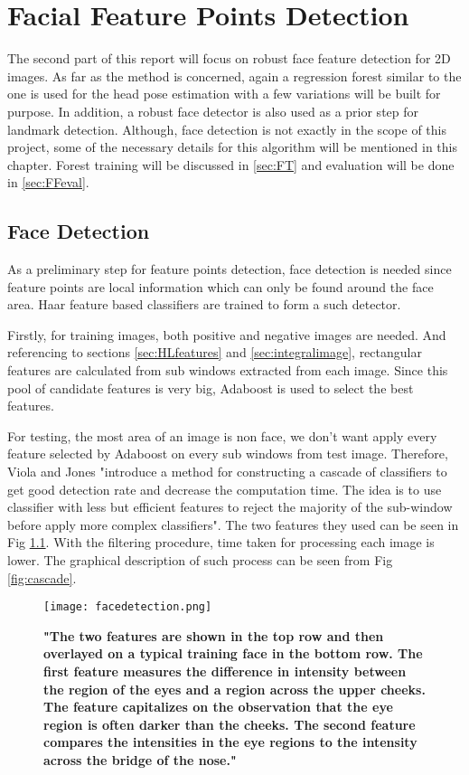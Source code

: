 \chapter{Facial Feature Points Detection}
\label{sec:FFPD}

The second part of this report will focus on robust face feature detection for 2D images. As far as the method is concerned, again a regression forest similar to the one is used for the head pose estimation with a few variations will be built for purpose. In addition, a robust face detector \cite{facedetect} is also used as a prior step for landmark detection. Although, face detection is not exactly in the scope of this project, some of the necessary details for this algorithm will be mentioned in this chapter. Forest training will be discussed in \ref{sec:FT} and evaluation will be done in \ref{sec:FFeval}.

\clearpage
\section{Face Detection}
\label{sec:FD}
As a preliminary step for feature points detection, face detection is needed since feature points are local information which can only be found around the face area. Haar feature based classifiers are trained to form a such detector.

Firstly, for training images, both positive and negative images are needed. And referencing to sections \ref{sec:HLfeatures} and \ref{sec:integralimage}, rectangular features are calculated from sub windows extracted from each image. Since this pool of candidate features is very big, Adaboost is used to select the best features. \cite{facedetect}

For testing, the most area of an image is non face, we don't want apply every feature selected by Adaboost on every sub windows from test image. Therefore, Viola and Jones "introduce a method for constructing a cascade of classifiers to get good detection rate and decrease the computation time. The idea is to use classifier with less but efficient features to reject the majority of the sub-window before apply more complex classifiers". \cite{facedetect} The two features they used can be seen in Fig \ref{fig:strongclassifiers}. With the filtering procedure, time taken for processing each image is lower. The graphical description of such process can be seen from Fig \ref{fig:cascade}.

\begin{figure}
	\centering
	\texttt{[image: facedetection.png]}
	\caption[Two Efficient Selected by AdaBoost]{\label{fig:strongclassifiers}}  \textbf{"The two features are shown in the top row and then overlayed on a typical training face in the bottom row. The first feature measures the difference in intensity between the region of the eyes and a region across the upper cheeks. The feature capitalizes on the observation that the eye region is often darker than the cheeks. The second feature compares the intensities in the eye regions to the intensity across the bridge of the nose." \cite{facedetect}}
\end{figure}

